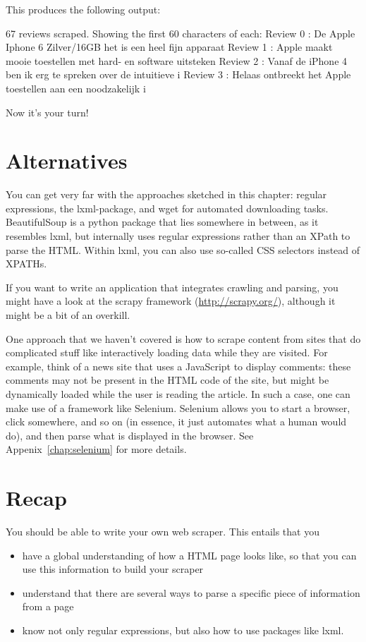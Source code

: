 \documentclass[a4paper,12pt]{book}
\begin{document}
This produces the following output:

\begin{lstlistingoutput}
67 reviews scraped. Showing the first 60 characters of each:
Review 0 : De Apple Iphone 6 Zilver/16GB het is een heel fijn apparaat 
Review 1 : Apple maakt mooie toestellen met hard- en software uitsteken
Review 2 : Vanaf de iPhone 4 ben ik erg te spreken over de intuitieve i
Review 3 : Helaas ontbreekt het Apple toestellen aan een noodzakelijk i
\end{lstlistingoutput}

Now it's your turn!


\section{Alternatives}
You can get very far with the approaches sketched in this chapter: regular expressions, the lxml-package, and wget for automated downloading tasks. BeautifulSoup is a python package that lies somewhere in between, as it resembles lxml, but internally uses regular expressions rather than an XPath to parse the HTML. Within lxml, you can also use so-called CSS selectors instead of XPATHs.

If you want to write an application that integrates crawling and parsing, you might have a look at the scrapy framework (\url{http://scrapy.org/}), although it might be a bit of an overkill.

One approach that we haven't covered is how to scrape content from sites that do complicated stuff like interactively loading data while they are visited. For example, think of a news site that uses a JavaScript to display comments: these comments may not be present in the HTML code of the site, but might be dynamically loaded while the user is reading the article. In such a case, one can make use of a framework like Selenium. Selenium allows you to start a browser, click somewhere, and so on (in essence, it just automates what a human would do), and then parse what is displayed in the browser. See Appenix~\ref{chap:selenium} for more details.

\section{Recap}
You should be able to write your own web scraper. This entails that you
\begin{itemize}
	\item have a global understanding of how a HTML page looks like, so that you can use this information to build your scraper
	\item understand that there are several ways to parse a specific piece of information from a page
	\item know not only regular expressions, but also how to use packages like lxml.
\end{itemize}
\end{document}
